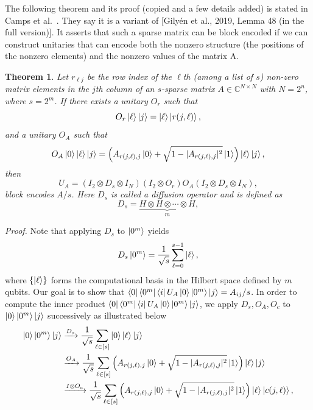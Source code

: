\documentclass{article}
\newtheorem{theorem}{Theorem}[section]
\begin{document}

\noindent The following theorem and its proof (copied and a few details added) is stated in Camps et al.~\cite{camps2024explicit}. They say it is a variant of [Gilyén et al., 2019, Lemma 48 (in the full version)]. It asserts that such a sparse matrix can be block encoded if we can construct unitaries that can encode both the nonzero structure (the positions of the nonzero elements) and the nonzero values of the matrix A.

\setcounter{section}{4} %
\begin{theorem}
Let $r_{\ell j}$ be the row index of the $\ell$th (among a list of $s$) non-zero matrix elements in the $j$th column of an $s$-sparse matrix $A \in \mathbb{C}^{N \times N}$ with $N = 2^n$, where $s = 2^m$. If there exists a unitary $O_r$ such that
\begin{equation}
O_r \ket{\ell} \ket{j} = \ket{\ell} \ket{r(j, \ell)},
\end{equation}
and a unitary $O_A$ such that
\begin{equation}
O_A \ket{0} \ket{\ell} \ket{j} = \left( A_{r(j,\ell), j} \ket{0} + \sqrt{1 - |A_{r(j,\ell), j}|^2} \ket{1} \right) \ket{\ell} \ket{j},
\end{equation}
then
\begin{equation}
U_A = (I_2 \otimes D_s \otimes I_N) (I_2 \otimes O_r) O_A (I_2 \otimes D_s \otimes I_N),
\end{equation}
block encodes $A/s$. Here $D_s$ is called a diffusion operator and is defined as
\begin{equation}
D_s = \underbrace{H \otimes H \otimes \cdots \otimes H}_{m},
\end{equation}
\end{theorem}

\noindent \textit{Proof.} Note that applying $D_s$ to $\ket{0^m}$ yields
\begin{equation*}
D_s \ket{0^m} = \frac{1}{\sqrt{s}} \sum_{\ell=0}^{s-1} \ket{\ell},
\end{equation*}
where $\{\ket{\ell}\}$ forms the computational basis in the Hilbert space defined by $m$ qubits. Our goal is to show that $\bra{0} \bra{0^m} \bra{i} U_A \ket{0} \ket{0^m} \ket{j} = A_{ij}/s$. In order to compute the inner product $\bra{0} \bra{0^m} \bra{i} U_A \ket{0} \ket{0^m} \ket{j}$, we apply $D_s, O_A, O_c$ to $\ket{0} \ket{0^m} \ket{j}$ successively as illustrated below
\begin{align}
\ket{0} \ket{0^m} \ket{j} &\xrightarrow{D_s} \frac{1}{\sqrt{s}} \sum_{\ell \in [s]} \ket{0} \ket{\ell} \ket{j} \nonumber \\
&\xrightarrow{O_A} \frac{1}{\sqrt{s}} \sum_{\ell \in [s]} \left( A_{r(j,\ell), j} \ket{0} + \sqrt{1 - |A_{r(j,\ell), j}|^2} \ket{1} \right) \ket{\ell} \ket{j} \label{eq:successive_application} \\
&\xrightarrow{I \otimes O_c} \frac{1}{\sqrt{s}} \sum_{\ell \in [s]} \left( A_{r(j,\ell), j} \ket{0} + \sqrt{1 - |A_{r(j,\ell), j}|^2} \ket{1} \right) \ket{\ell} \ket{c(j,\ell)}, \nonumber
\end{align}
\end{document}
